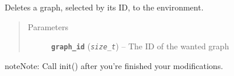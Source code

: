 \documentclass[letterpaper,10pt,english]{sphinxmanual}
\begin{document}
\begin{fulllineitems}
\label{doc:gedlibpy.clear_graph}
Deletes a graph, selected by its ID, to the environment.
\begin{quote}\begin{description}
\item[{Parameters}] \leavevmode
\textbf{\texttt{graph\_id}} (\emph{\texttt{size\_t}}) -- The ID of the wanted graph

\end{description}\end{quote}

\begin{notice}{note}{Note:}
Call init() after you're finished your modifications.
\end{notice}

\end{fulllineitems}

\end{document}
